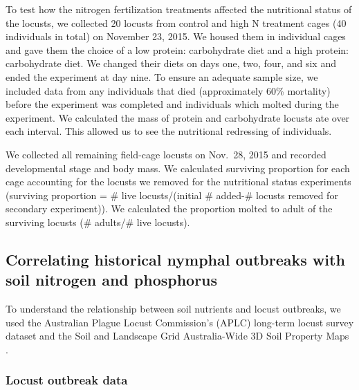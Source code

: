 \documentclass[
]{article}
\begin{document}
To test how the nitrogen fertilization treatments affected the
nutritional status of the locusts, we collected 20 locusts from control
and high N treatment cages (40 individuals in total) on November 23,
2015. We housed them in individual cages and gave them the choice of a
low protein: carbohydrate diet and a high protein: carbohydrate diet. We
changed their diets on days one, two, four, and six and ended the
experiment at day nine. To ensure an adequate sample size, we included
data from any individuals that died (approximately 60\% mortality)
before the experiment was completed and individuals which molted during
the experiment. We calculated the mass of protein and carbohydrate
locusts ate over each interval. This allowed us to see the nutritional
redressing of individuals.

We collected all remaining field-cage locusts on Nov.~28, 2015 and
recorded developmental stage and body mass. We calculated surviving
proportion for each cage accounting for the locusts we removed for the
nutritional status experiments (surviving proportion = \# live
locusts/(initial \# added-\# locusts removed for secondary experiment)).
We calculated the proportion molted to adult of the surviving locusts
(\# adults/\# live locusts).

\subsection{Correlating historical nymphal outbreaks with soil nitrogen
and
phosphorus}\label{correlating-historical-nymphal-outbreaks-with-soil-nitrogen-and-phosphorus}

To understand the relationship between soil nutrients and locust
outbreaks, we used the Australian Plague Locust Commission's (APLC)
long-term locust survey dataset \citep{deveson_operation_2002} and the
Soil and Landscape Grid Australia-Wide 3D Soil Property Maps
\citep{grundy_soil_2015}.

\subsubsection{Locust outbreak data}\label{locust-outbreak-data}
\end{document}
